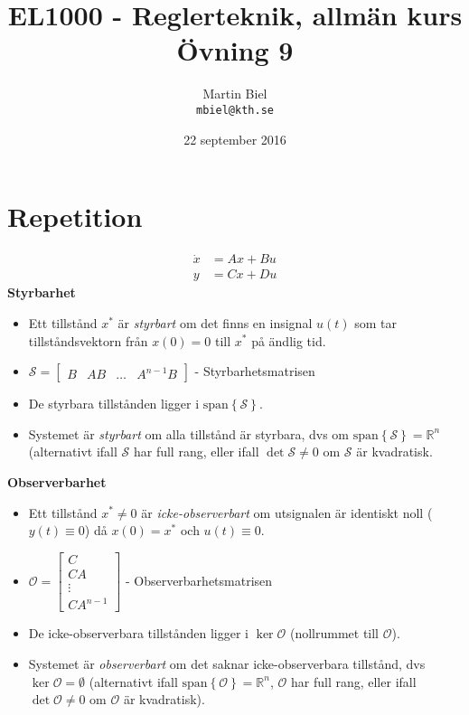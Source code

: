 \documentclass[12pt]{article}
\newcommand{\sspan}[1]{\mathrm{span}\left\{#1\right\}}
\begin{document}
\begin{titlepage}
\author{Martin Biel \\ \texttt{mbiel@kth.se}}
\title{EL1000 - Reglerteknik, allmän kurs \\ \Large Övning 9}
\date{22 september 2016}
\end{titlepage}

\maketitle

\section*{Repetition}
\begin{align*}
  \dot{x} &= Ax + Bu \\
  y &= Cx + Du
\end{align*}
\textbf{Styrbarhet} \\
\begin{itemize}
\item Ett tillstånd $x^*$ är \emph{styrbart} om det finns en insignal $u(t)$ som tar tillståndsvektorn från $x(0) = 0$ till $x^*$ på ändlig tid.
\item $\mathcal{S} =
  \begin{bmatrix}
    B & AB & \dots & A^{n-1}B
  \end{bmatrix}$ - Styrbarhetsmatrisen
\item De styrbara tillstånden ligger i $\sspan{\mathcal{S}}$.
\item Systemet är \emph{styrbart} om alla tillstånd är styrbara, dvs om $\sspan{\mathcal{S}} = \mathbb{R}^n$ (alternativt ifall $\mathcal{S}$ har full rang, eller ifall $\det{\mathcal{S}} \neq 0$ om $\mathcal{S}$ är kvadratisk.
\end{itemize}
\textbf{Observerbarhet}
\begin{itemize}
\item Ett tillstånd $x^* \neq 0$ är \emph{icke-observerbart} om utsignalen är identiskt noll ($y(t) \equiv 0$) då $x(0) = x^*$ och $u(t) \equiv 0$.
\item $\mathcal{O} =
  \begin{bmatrix}
    C \\
    CA \\
    \vdots \\
    CA^{n-1}
  \end{bmatrix}$ - Observerbarhetsmatrisen
\item De icke-observerbara tillstånden ligger i $\ker{\mathcal{O}}$ (nollrummet till $\mathcal{O}$).
\item Systemet är \emph{observerbart} om det saknar icke-observerbara tillstånd, dvs $\ker{\mathcal{O}} = \emptyset$ (alternativt ifall $\sspan{\mathcal{O}} = \mathbb{R}^n$, $\mathcal{O}$ har full rang, eller ifall $\det{\mathcal{O}} \neq 0$ om $\mathcal{O}$ är kvadratisk).
\end{itemize}
\end{document}

